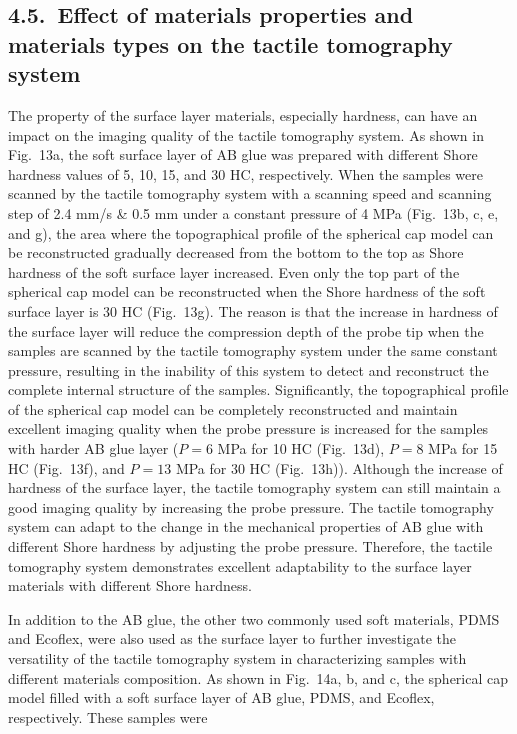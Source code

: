 \documentclass[11pt]{article}
\begin{document}
\vspace{0.8em}

\subsection*{4.5.\ Effect of materials properties and materials types on the tactile tomography system}

The property of the surface layer materials, especially hardness,
can have an impact on the imaging quality of the tactile tomography
system. As shown in Fig.~13a, the soft surface layer of AB glue was
prepared with different Shore hardness values of 5, 10, 15, and 30
HC, respectively. When the samples were scanned by the tactile
tomography system with a scanning speed and scanning step of 2.4
mm/s \& 0.5 mm under a constant pressure of 4 MPa (Fig.~13b, c, e,
and g), the area where the topographical profile of the spherical
cap model can be reconstructed gradually decreased from the bottom
to the top as Shore hardness of the soft surface layer increased.
Even only the top part of the spherical cap model can be
reconstructed when the Shore hardness of the soft surface layer is
30 HC (Fig.~13g). The reason is that the increase in hardness of
the surface layer will reduce the compression depth of the probe
tip when the samples are scanned by the tactile tomography system
under the same constant pressure, resulting in the inability of
this system to detect and reconstruct the complete internal
structure of the samples. Significantly, the topographical profile
of the spherical cap model can be completely reconstructed and
maintain excellent imaging quality when the probe pressure is
increased for the samples with harder AB glue layer ($P = 6$ MPa
for 10 HC (Fig.~13d), $P = 8$ MPa for 15 HC (Fig.~13f), and $P =
13$ MPa for 30 HC (Fig.~13h)). Although the increase of hardness
of the surface layer, the tactile tomography system can still
maintain a good imaging quality by increasing the probe pressure.
The tactile tomography system can adapt to the change in the
mechanical properties of AB glue with different Shore hardness by
adjusting the probe pressure. Therefore, the tactile tomography
system demonstrates excellent adaptability to the surface layer
materials with different Shore hardness.

In addition to the AB glue, the other two commonly used soft
materials, PDMS and Ecoflex, were also used as the surface layer
to further investigate the versatility of the tactile tomography
system in characterizing samples with different materials
composition. As shown in Fig.~14a, b, and c, the spherical cap
model filled with a soft surface layer of AB glue, PDMS, and
Ecoflex, respectively. These samples were
\end{document}
